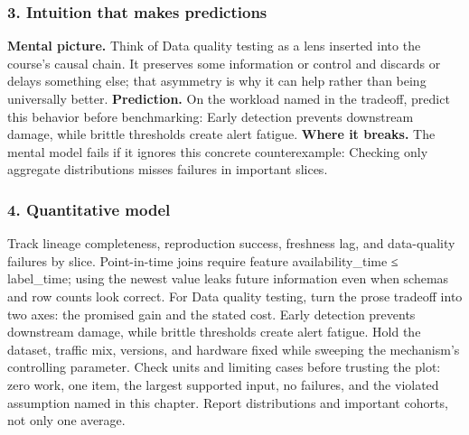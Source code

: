 \subsubsection*{3. Intuition that makes predictions}
\textbf{Mental picture.} Think of Data quality testing as a lens inserted into the course's causal chain. It preserves some information or control and discards or delays something else; that asymmetry is why it can help rather than being universally better.
\textbf{Prediction.} On the workload named in the tradeoff, predict this behavior before benchmarking: Early detection prevents downstream damage, while brittle thresholds create alert fatigue.
\textbf{Where it breaks.} The mental model fails if it ignores this concrete counterexample: Checking only aggregate distributions misses failures in important slices.
\subsubsection*{4. Quantitative model}
Track lineage completeness, reproduction success, freshness lag, and data-quality failures by slice. Point-in-time joins require feature availability\_time ≤ label\_time; using the newest value leaks future information even when schemas and row counts look correct.
For Data quality testing, turn the prose tradeoff into two axes: the promised gain and the stated cost. Early detection prevents downstream damage, while brittle thresholds create alert fatigue. Hold the dataset, traffic mix, versions, and hardware fixed while sweeping the mechanism's controlling parameter.
Check units and limiting cases before trusting the plot: zero work, one item, the largest supported input, no failures, and the violated assumption named in this chapter. Report distributions and important cohorts, not only one average.
